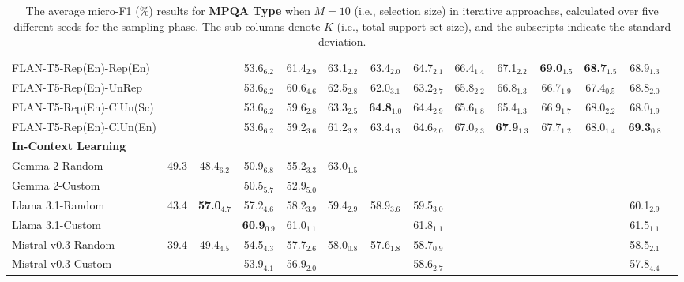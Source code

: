 \documentclass[11pt]{article}
\theoremstyle{definition}
\begin{document}
\begin{table*}[hbt]
{\begin{tabular}{l|ccccccccccccc}
FLAN-T5-Rep(En)-Rep(En) &
& & 53.6$_{6.2}$ & 61.4$_{2.9}$ & 63.1$_{2.2}$ & 63.4$_{2.0}$ & 64.7$_{2.1}$ & 66.4$_{1.4}$ & 67.1$_{2.2}$ & \textbf{69.0}$_{1.5}$ & \textbf{68.7}$_{1.5}$ & 68.9$_{1.3}$ & \\

FLAN-T5-Rep(En)-UnRep &
& & 53.6$_{6.2}$ & 60.6$_{4.6}$ & 62.5$_{2.8}$ & 62.0$_{3.1}$ & 63.2$_{2.7}$ & 65.8$_{2.2}$ & 66.8$_{1.3}$ & 66.7$_{1.9}$ & 67.4$_{0.5}$ & 68.8$_{2.0}$ & \\

FLAN-T5-Rep(En)-ClUn(Sc) &
& & 53.6$_{6.2}$ & 59.6$_{2.8}$ & 63.3$_{2.5}$ & \textbf{64.8}$_{1.0}$ & 64.4$_{2.9}$ & 65.6$_{1.8}$ & 65.4$_{1.3}$ & 66.9$_{1.7}$ & 68.0$_{2.2}$ & 68.0$_{1.9}$ & \\

FLAN-T5-Rep(En)-ClUn(En) &
& & 53.6$_{6.2}$ & 59.2$_{3.6}$ & 61.2$_{3.2}$ & 63.4$_{1.3}$ & 64.6$_{2.0}$ & 67.0$_{2.3}$ & \textbf{67.9}$_{1.3}$ & 67.7$_{1.2}$ & 68.0$_{1.4}$ & \textbf{69.3}$_{0.8}$ & \\

\hdashline

\textbf{In-Context Learning} \\

Gemma 2-Random &
49.3 & 48.4$_{6.2}$ & 50.9$_{6.8}$ & 55.2$_{3.3}$ & 63.0$_{1.5}$ & & & \\
Gemma 2-Custom &
& & 50.5$_{5.7}$ & 52.9$_{5.0}$ & & & \\

\hdashline[1pt/4pt]

Llama 3.1-Random &
43.4 & \textbf{57.0}$_{4.7}$ & 57.2$_{4.6}$ & 58.2$_{3.9}$ & 59.4$_{2.9}$ & 58.9$_{3.6}$ & 59.5$_{3.0}$ & & & & & 60.1$_{2.9}$ \\
Llama 3.1-Custom &
& & \textbf{60.9}$_{0.9}$ & 61.0$_{1.1}$ & & & 61.8$_{1.1}$ & & & & & 61.5$_{1.1}$ & \\

\hdashline[1pt/4pt]

Mistral v0.3-Random &
39.4 & 49.4$_{4.5}$ & 54.5$_{4.3}$ & 57.7$_{2.6}$ & 58.0$_{0.8}$ & 57.6$_{1.8}$ & 58.7$_{0.9}$ & & & & & 58.5$_{2.1}$ \\
Mistral v0.3-Custom &
& & 53.9$_{4.1}$ & 56.9$_{2.0}$ & & & 58.6$_{2.7}$ & & & & & 57.8$_{4.4}$ & \\

\hline

\end{tabular}
}
\caption{The average micro-F1 (\%) results for {\bf MPQA Type} when $M=10$ (i.e., selection size) in iterative approaches, calculated over five different seeds for the sampling phase. The sub-columns denote $K$ (i.e., total support set size), and the subscripts indicate the standard deviation.}
\label{table:t-complete}
\end{table*}
\end{document}
